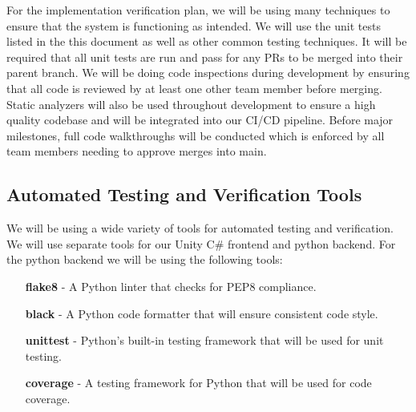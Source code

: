 \documentclass[12pt, titlepage]{article}
\begin{document}
For the implementation verification plan, we will be using many techniques to ensure that the system is functioning as intended.
We will use the unit tests listed in the this document as well as other common testing techniques.
It will be required that all unit tests are run and pass for any PRs to be merged into their parent branch.
We will be doing code inspections during development by ensuring that all code is reviewed by at least one other team member before merging.
Static analyzers will also be used throughout development to ensure a high quality codebase and will be integrated into our CI/CD pipeline.
Before major milestones, full code walkthroughs will be conducted which is enforced by all team members needing to approve merges into main.

\subsection{Automated Testing and Verification Tools}


  \noindent We will be using a wide variety of tools for automated testing and verification.
  We will use separate tools for our Unity C\# frontend and python backend.
  \bigskip
  \newline
  For the python backend we will be using the following tools:
  \begin{itemize}
    \item [\textbf{flake8}] - A Python linter that checks for PEP8 compliance.
    \item [\textbf{black}] - A Python code formatter that will ensure consistent code style.
    \item [\textbf{unittest}] - Python's built-in testing framework that will be used for unit testing.
    \item [\textbf{coverage}] - A testing framework for Python that will be used for code coverage.
  \end{itemize}
\end{document}
